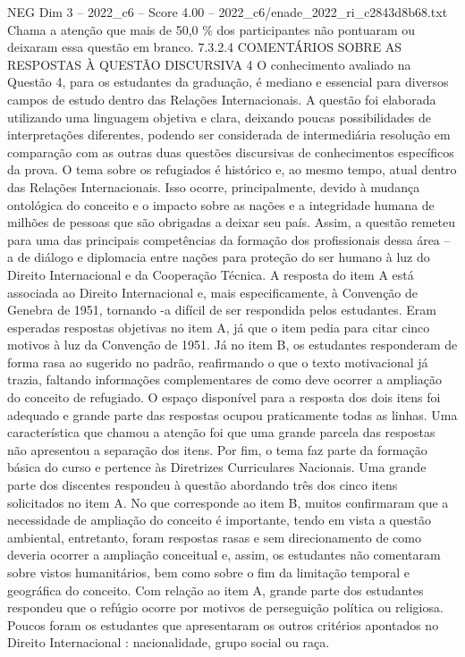 \begin{textsample}{NEG Dim 3 – 2022\_c6 – Score 4.00 – 2022\_c6/enade\_2022\_ri\_c2843d8b68.txt}
Chama a atenção que mais de 50,0 \% dos participantes não pontuaram ou deixaram essa questão em branco. 7.3.2.4 COMENTÁRIOS SOBRE AS RESPOSTAS À QUESTÃO DISCURSIVA 4 O conhecimento avaliado na Questão 4, para os estudantes da graduação, é mediano e essencial para diversos campos de estudo dentro das Relações Internacionais.
A questão foi elaborada utilizando uma linguagem objetiva e clara, deixando poucas possibilidades de interpretações diferentes, podendo ser considerada de intermediária resolução em comparação com as outras duas questões discursivas de conhecimentos específicos da prova.
O tema sobre os refugiados é histórico e, ao mesmo tempo, atual dentro das Relações Internacionais.
Isso ocorre, principalmente, devido à mudança ontológica do conceito e o impacto sobre as nações e a integridade humana de milhões de pessoas que são obrigadas a deixar seu país.
Assim, a questão remeteu para uma das principais competências da formação dos profissionais dessa área – a de diálogo e diplomacia entre nações para proteção do ser humano à luz do Direito Internacional e da Cooperação Técnica.
A resposta do item A está associada ao Direito Internacional e, mais especificamente, à Convenção de Genebra de 1951, tornando -a difícil de ser respondida pelos estudantes.
Eram esperadas respostas objetivas no item A, já que o item pedia para citar cinco motivos à luz da Convenção de 1951.
Já no item B, os estudantes responderam de forma rasa ao sugerido no padrão, reafirmando o que o texto motivacional já trazia, faltando informações complementares de como deve ocorrer a ampliação do conceito de refugiado.
O espaço disponível para a resposta dos dois itens foi adequado e grande parte das respostas ocupou praticamente todas as linhas.
Uma característica que chamou a atenção foi que uma grande parcela das respostas não apresentou a separação dos itens.
Por fim, o tema faz parte da formação básica do curso e pertence às Diretrizes Curriculares Nacionais.
Uma grande parte dos discentes respondeu à questão abordando três dos cinco itens solicitados no item A.
No que corresponde ao item B, muitos confirmaram que a necessidade de ampliação do conceito é importante, tendo em vista a questão ambiental, entretanto, foram respostas rasas e sem direcionamento de como deveria ocorrer a ampliação conceitual e, assim, os estudantes não comentaram sobre vistos humanitários, bem como sobre o fim da limitação temporal e geográfica do conceito.
Com relação ao item A, grande parte dos estudantes respondeu que o refúgio ocorre por motivos de perseguição política ou religiosa.
Poucos foram os estudantes que apresentaram os outros critérios apontados no Direito Internacional : nacionalidade, grupo social ou raça.

\end{textsample}
